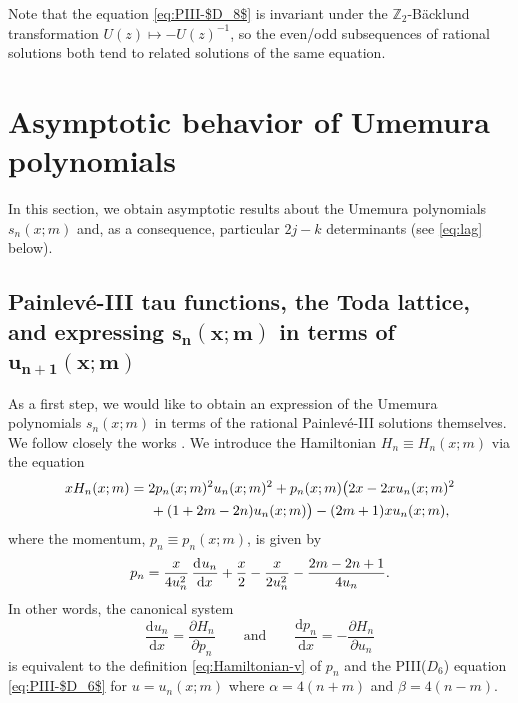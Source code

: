 \documentclass[pdftex]{sigma}
\numberwithin{equation}{section}
\newcommand{\dd}{\mathrm{d}}
\begin{document}
Note that the equation \eqref{eq:PIII-$D_8$} is invariant under the $\mathbb{Z}_2$-B\"acklund transformation $U(z)\mapsto -U(z)^{-1}$, so the even/odd subsequences of rational solutions both tend to related solutions of the same equation.

\section{Asymptotic behavior of Umemura polynomials}
\label{sec:Umemura}
In this section, we obtain asymptotic results about the Umemura polynomials $s_n(x;m)$ and, as a consequence, particular $2j - k$ determinants (see \eqref{eq:lag} below).

\subsection[Painlev\'e-III tau functions, the Toda lattice, and expressing s\_n(x;m) in terms of u\_\{n+1\}(x;m)]{Painlev\'e-III tau functions, the Toda lattice,\\ and expressing $\boldsymbol{s_n(x;m)}$ in terms of $\boldsymbol{u_{n+1}(x;m)}$}

As a first step, we would like to obtain an expression of the Umemura polynomials $s_n(x;m)$ in terms of the rational Painlev\'e-III solutions themselves. We follow closely the works \cite{FW03,O87}. We introduce the Hamiltonian $H_n \equiv H_n(x;m)$ via the equation
\begin{gather}
 xH_n(x;m) = 2p_n(x;m)^2u_n(x;m)^2+p_n(x;m)\big(2x-2xu_n(x;m)^2 \nonumber\\
\hphantom{xH_n(x;m) =}{}
+(1+2m-2n)u_n(x;m)\big) -(2m+1)xu_n(x;m),
 \label{eq:$D_6$-Hamiltonian}
\end{gather}
where the momentum, $p_n \equiv p_n(x;m)$, is given by
\begin{equation}
 p_n=\frac{x}{4u_n^2}\dod{u_n}{x}+\frac{x}{2}-\frac{x}{2u_n^2}-\frac{2m-2n+1}{4u_n}.
 \label{eq:Hamiltonian-v}
\end{equation}
In other words, the canonical system
\[
\frac{\dd u_n}{\dd x}=\frac{\partial H_n}{\partial p_n}\qquad\text{and}\qquad\frac{\dd p_n}{\dd x}=-\frac{\partial H_n}{\partial u_n}
\]
is equivalent to the definition \eqref{eq:Hamiltonian-v} of $p_n$ and the PIII($D_6$) equation \eqref{eq:PIII-$D_6$} for $u=u_n(x;m)$ where $\alpha=4(n+m)$ and $\beta=4(n-m)$.
\end{document}

